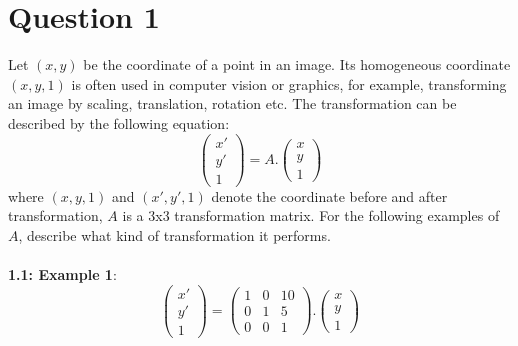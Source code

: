 \documentclass[12pt]{article}
\begin{document}
\maketitle

\section*{Question 1}
Let $(x, y)$ be the coordinate of a point in an image. Its homogeneous coordinate $(x, y, 1)$ is often
used in computer vision or graphics, for example, transforming an image by scaling, translation,
rotation etc. The transformation can be described by the following equation:
\begin{equation*}
    \begin{pmatrix}
        x' \\
        y' \\
        1 
    \end{pmatrix} = A . 
    \begin{pmatrix}
        x \\
        y \\
        1
    \end{pmatrix}
\end{equation*}
where $(x, y, 1)$ and $(x', y', 1)$ denote the coordinate before and after transformation, $A$ is a 3x3
transformation matrix. For the following examples of $A$, describe what kind of transformation it
performs.
\\
\\
\textbf{1.1: Example 1}: 
\begin{equation*}
    \begin{pmatrix}
        x' \\
        y' \\
        1 
    \end{pmatrix} = 
    \begin{pmatrix}
        1 & 0 & 10 \\
        0 & 1 & 5 \\
        0 & 0 & 1
    \end{pmatrix} . 
    \begin{pmatrix}
        x \\
        y \\
        1
    \end{pmatrix}
\end{equation*}
\end{document}
